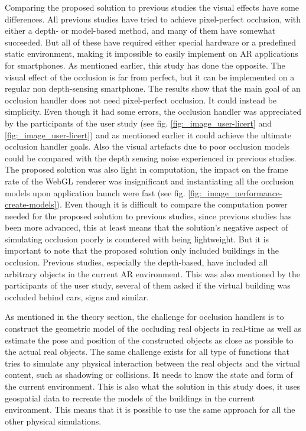 Comparing the proposed solution to previous studies the visual effects have some differences. All previous studies have tried to achieve pixel-perfect occlusion, with either a depth- or model-based method, and many of them have somewhat succeeded. But all of these have required either special hardware or a predefined static environment, making it impossible to easily implement on AR applications for smartphones. As mentioned earlier, this study has done the opposite. The visual effect of the occlusion is far from perfect, but it can be implemented on a regular non depth-sensing smartphone. The results show that the main goal of an occlusion handler does not need pixel-perfect occlusion. It could instead be simplicity. Even though it had some errors, the occlusion handler was appreciated by the participants of the user study (see fig. \ref{fig:_image_user-licert} and \ref{fig:_image_user-licert}) and as mentioned earlier it could achieve the ultimate occlusion handler goals. Also the visual artefacts due to poor occlusion models could be compared with the depth sensing noise experienced in previous studies. The proposed solution was also light in computation, the impact on the frame rate of the WebGL renderer was insignificant and instantiating all the occlusion models upon application launch were fast (see fig. \ref{fig:_image_performance-create-models}). Even though it is difficult to compare the computation power needed for the proposed solution to previous studies, since previous studies has been more advanced, this at least means that the solution's negative aspect of simulating occlusion poorly is countered with being lightweight. But it is important to note that the proposed solution only included buildings in the occlusion. Previous studies, especially the depth-based, have included all arbitrary objects in the current AR environment. This was also mentioned by the participants of the user study, several of them asked if the virtual building was occluded behind cars, signs and similar.

As mentioned in the theory section, the challenge for occlusion handlers is to  construct the geometric model of the occluding real objects in real-time as well as estimate the pose and position of the constructed objects as close as possible to the actual real objects. The same challenge exists for all type of functions that tries to simulate any physical interaction between the real objects and the virtual content, such as shadowing or collisions. It needs to know the state and form of the current environment. This is also what the solution in this study does, it uses geospatial data to recreate the models of the buildings in the current environment. This means that it is possible to use the same approach for all the other physical simulations.

